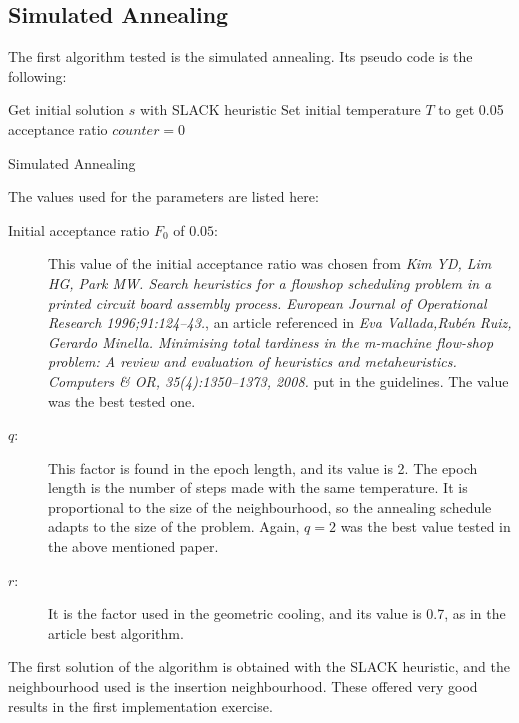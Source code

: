 \subsection{Simulated Annealing}
The first algorithm tested is the simulated annealing. Its pseudo code is the following:

\begin{algorithm}[H]
 Get initial solution $s$ with SLACK heuristic\;
 Set initial temperature $T$ to get 0.05 acceptance ratio\;
 $counter = 0$\;
 \caption{Simulated Annealing}
\end{algorithm}

The values used for the parameters are listed here:
\begin{description}
\item[Initial acceptance ratio $F_0$ of $0.05$:] This value of the initial acceptance ratio was chosen from \emph{Kim YD, Lim HG, Park MW. Search heuristics for a flowshop scheduling problem in a printed circuit board assembly process. European Journal
of Operational Research 1996;91:124–43.}, an article referenced in \emph{Eva Vallada,Rubén Ruiz, Gerardo Minella. Minimising total tardiness in the m-machine flow-shop problem: A review and evaluation of heuristics and metaheuristics. Computers \& OR, 35(4):1350–1373, 2008.} put in the guidelines. The value was the best tested one.

\item[$q$:] This factor is found in the epoch length, and its value is 2. The epoch length is the number of steps made with the same temperature. It is proportional to the size of the neighbourhood, so the annealing schedule adapts to the size of the problem. Again, $q = 2$ was the best value tested in the above mentioned paper.

\item[$r$:] It is the factor used in the geometric cooling, and its value is 0.7, as in the article best algorithm.
\end{description}

The first solution of the algorithm is obtained with the SLACK heuristic, and the neighbourhood used is the insertion neighbourhood. These offered very good results in the first implementation exercise.\\

